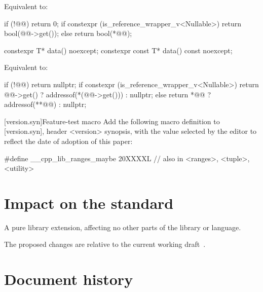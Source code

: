 \documentclass[a4paper,10pt,oneside,openany,final,article]{memoir}
\begin{document}
\begin{wording}
\begin{itemdescr}
  \pnum{}
  \effects{}
  Equivalent to:

  \begin{codeblock}
    if (!@@)
      return 0;
    if constexpr (is_reference_wrapper_v<Nullable>) {
      return bool(@@->get());
    } else {
      return bool(*@@);
    }
  \end{codeblock}
\end{itemdescr}

\begin{itemdecl}
  constexpr T* data() noexcept;
  constexpr const T* data() const noexcept;
\end{itemdecl}

\begin{itemdescr}
\pnum{}
\effects{}
Equivalent to:
\begin{codeblock}
  if (!@@)
    return nullptr;
  if constexpr (is_reference_wrapper_v<Nullable>) {
    return @@->get() ? addressof(*(@@->get())) : nullptr;
  } else {
    return *@@ ? addressof(**@@) : nullptr;
  }
\end{codeblock}
\end{itemdescr}

[version.syn]{Feature-test macro}
Add the following macro definition to [version.syn], header <version> synopsis, with the value selected by the editor to reflect the date of adoption of this paper:

\begin{codeblock}
  #define __cpp_lib_ranges_maybe 20XXXXL // also in <ranges>, <tuple>, <utility>
\end{codeblock}

\end{wording}

\chapter{Impact on the standard}

A pure library extension, affecting no other parts of the library or language.

The proposed changes are relative to the current working draft~\cite{N4958}.

\chapter*{Document history}
\end{document}

